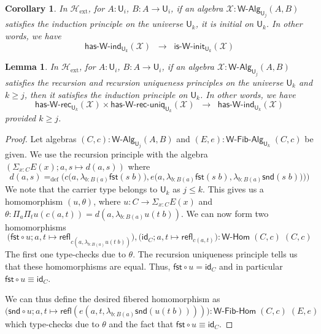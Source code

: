\documentclass[reqno,10pt,a4paper,oneside]{amsart}
\newcommand{\X}{\mathcal{X}}
\newcommand{\fst}{\mathsf{fst}}
\newcommand{\snd}{\mathsf{snd}}
\newcommand{\comp}{\circ}
\newcommand{\idfun}[1]{\mathsf{id}_{#1}}
\newcommand{\prd}[1]{\Pi_{#1}}
\newcommand{\sm}[1]{\Sigma_{#1}}
\newcommand{\lam}[1]{\lambda_{#1}}
\newcommand{\defeq}{=_{\mathrm{def}}}
\newcommand{\refl}{\mathsf{refl}}
\newcommand{\W}{\mathsf{W}}
\newcommand{\UU}{\mathsf{U}}
\newcommand{\WAlg}{\mathsf{W}\text{-}\mathsf{Alg}}
\newcommand{\WFibAlg}{\mathsf{W}\text{-}\mathsf{Fib}\text{-}\mathsf{Alg}}
\newcommand{\WHom}{\mathsf{W}\text{-}\mathsf{Hom}}
\newcommand{\WFibHom}{\mathsf{W}\text{-}\mathsf{Fib}\text{-}\mathsf{Hom}}
\newcommand{\HasWRec}{\mathsf{has}\text{-}\mathsf{W}\text{-}\mathsf{rec}}
\newcommand{\HasWInd}{\mathsf{has}\text{-}\mathsf{W}\text{-}\mathsf{ind}}
\newcommand{\HasWRecUniq}{\mathsf{has}\text{-}\mathsf{W}\text{-}\mathsf{rec}\text{-}\mathsf{uniq}}
\newcommand{\IsWInit}{\mathsf{is}\text{-}\mathsf{\W}\text{-}\mathsf{init}}
\newcommand{\Hext}{\mathcal{H}_{\mathrm{ext}}}
\numberwithin{equation}{section}
\theoremstyle{mythm}
\newtheorem{lemma}[theorem]{Lemma}
\newtheorem{corollary}[theorem]{Corollary}
\theoremstyle{mydef}
\theoremstyle{myrmk}
\begin{document}

\begin{corollary}\label{lem:WIndImpInit}
In $\Hext$, for $A:\UU_i$, $B : A \to \UU_i$, if an algebra $\X : \WAlg_{\UU_j}(A,B)$ satisfies the induction principle on the universe $\UU_k$, it is initial on $\UU_k$. In other words, we have
\[ \HasWInd_{\UU_k}(\X) \;\; \rightarrow \;\; \IsWInit_{\UU_k}(\X) \]
\end{corollary}

\begin{lemma}\label{lem:WRecUniqImpInd}
In $\Hext$, for $A:\UU_i$, $B : A \to \UU_i$, if an algebra $\X : \WAlg_{\UU_j}(A,B)$ satisfies the recursion and recursion uniqueness principles on the universe $\UU_k$ and $k \geq j$, then it satisfies the induction principle on $\UU_k$. In other words, we have
\[ \HasWRec_{\UU_k}(\X) \times \HasWRecUniq_{\UU_k}(\X) \;\; \rightarrow \; \; \HasWInd_{\UU_k}(\X) \]
provided $k \geq j$.
\end{lemma}
\begin{proof}
Let algebras $(C,c) : \WAlg_{\UU_j}(A,B)$ and $(E,e) : \WFibAlg_{\UU_k} \; (C,c)$ be given. 
We use the recursion principle with the algebra $(\sm{x:C} E(x); a,s \mapsto d(a,s))$ where
\[ d(a,s) \defeq \Big(c\big(a,\lam{b:B(a)} \fst(s\;b)\big), e\big(a, \lam{b:B(a)} \fst(s\;b), \lam{b:B(a)} \snd(s\;b)\big) \Big) \big) \]
We note that the carrier type belongs to $\UU_k$ as $j \leq k$. This gives us a homomorphism $(u,\theta)$, where $u : C \to \sm{x:C} E(x)$ and $\theta : \prd{a}\prd{t} u(c(a,t)) = d(a,\lam{b:B(a)}u(t\;b))$. We can now form two homomorphisms 
\[\big(\fst \comp u; a,t \mapsto \refl_{c(a,\lam{b:B(a)}u(t\;b))}\big), \big(\idfun{C}; a,t \mapsto \refl_{c(a,t)}\big) : \WHom \; (C,c) \; (C,c)\] The first one type-checks due to $\theta$. The recursion uniqueness principle tells us that these homomorphisms are equal. Thus, $\fst \comp u = \idfun{C}$ and in particular $\fst \comp u \equiv \idfun{C}$. 

We can thus define the desired fibered homomorphism as \[\big(\snd \comp u; a,t \mapsto \refl(e(a,t,\lam{b:B(a)}\snd(u(t\;b))))\big) : \WFibHom \; (C,c) \; (E,e)\]
which type-checks due to $\theta$ and the fact that $\fst \comp u \equiv \idfun{C}$.
\end{proof}
\end{document}

